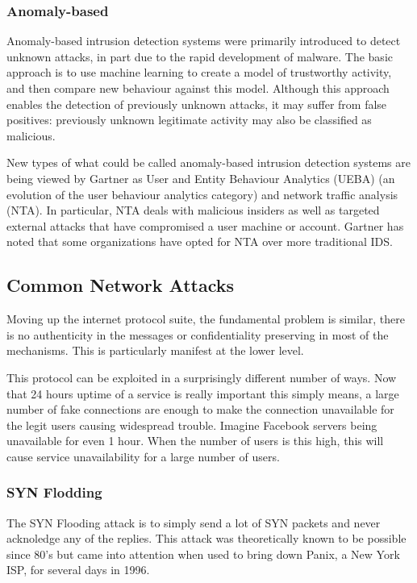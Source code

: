 \documentclass[12pt]{article}
\theoremstyle{definition}
\begin{document}
			\subsubsection{Anomaly-based}
			Anomaly-based intrusion detection systems were primarily introduced to detect unknown attacks, in part due to the rapid development of malware. The basic approach is to use machine learning to create a model of trustworthy activity, and then compare new behaviour against this model. Although this approach enables the detection of previously unknown attacks, it may suffer from false positives: previously unknown legitimate activity may also be classified as malicious.
			
			New types of what could be called anomaly-based intrusion detection systems are being viewed by Gartner as User and Entity Behaviour Analytics (UEBA) (an evolution of the user behaviour analytics category) and network traffic analysis (NTA). In particular, NTA deals with malicious insiders as well as targeted external attacks that have compromised a user machine or account. Gartner has noted that some organizations have opted for NTA over more traditional IDS.
		\subsection{Common Network Attacks}
			Moving up the internet protocol suite, the fundamental problem is similar, there is no authenticity in the messages or confidentiality preserving in most of the mechanisms. This is particularly manifest at the lower level. 
			
			This protocol can be exploited in a surprisingly different number of ways. Now that 24 hours uptime of a service is really important this simply means, a large number of fake connections are enough to make the connection unavailable for the legit users causing widespread trouble. Imagine Facebook servers being unavailable for even 1 hour. When the number of users is this high, this will cause service unavailability for a large number of users. 
			
			\subsubsection{SYN Flodding}
			The SYN Flooding attack is to simply send a lot of SYN packets and never acknoledge any of the replies. This attack was theoretically known to be possible since 80's but came into attention when used to bring down Panix, a New York ISP, for several days in 1996.
			
\end{document}
